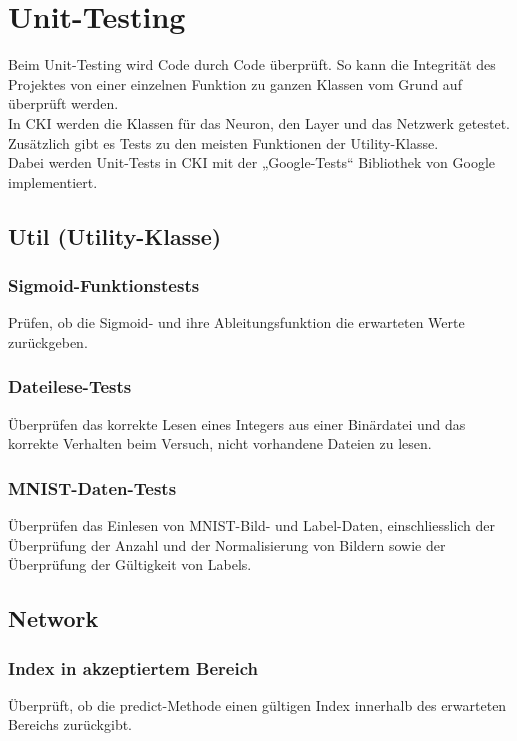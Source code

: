 \section{Unit-Testing}
\label{sec:DesignUnitTesting}
Beim Unit-Testing wird Code durch Code überprüft. So kann die Integrität des Projektes von einer einzelnen Funktion zu ganzen Klassen vom Grund auf überprüft werden.
\\
In CKI werden die Klassen für das Neuron, den Layer und das Netzwerk getestet. Zusätzlich gibt es Tests zu den meisten Funktionen der Utility-Klasse.
\\
Dabei werden Unit-Tests in CKI mit der „Google-Tests“ Bibliothek von Google implementiert.

\subsection{Util (Utility-Klasse)}
\label{sec:DesignUtilUtilityKlasse}
\subsubsection{Sigmoid-Funktionstests}
\label{sec:DesignSigmoidFunktionstests}
Prüfen, ob die Sigmoid- und ihre Ableitungsfunktion die erwarteten Werte zurückgeben.
\subsubsection{Dateilese-Tests}
\label{sec:DesignDateileseTests}
Überprüfen das korrekte Lesen eines Integers aus einer Binärdatei und das korrekte Verhalten beim Versuch, nicht vorhandene Dateien zu lesen.
\subsubsection{MNIST-Daten-Tests}
\label{sec:DesignMNISTDatenTests}
Überprüfen das Einlesen von MNIST-Bild- und Label-Daten, einschliesslich der Überprüfung der Anzahl und der Normalisierung von Bildern sowie der Überprüfung der Gültigkeit von Labels.

\subsection{Network}
\label{sec:DesignNetwork}
\subsubsection{Index in akzeptiertem Bereich}
\label{sec:DesignIndexInAkzeptiertemBereich}
Überprüft, ob die predict-Methode einen gültigen Index innerhalb des erwarteten Bereichs zurückgibt.
